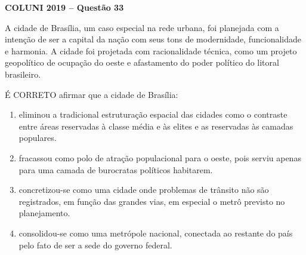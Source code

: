 \textbf{COLUNI 2019 -- Questão 33}\par\medskip A cidade de Brasília, um caso especial na rede urbana, foi planejada com a intenção de ser a capital da nação com seus tons de modernidade, funcionalidade e harmonia. A cidade foi projetada com racionalidade técnica, como um projeto geopolítico de ocupação do oeste e afastamento do poder político do litoral brasileiro.

\par

É CORRETO afirmar que a cidade de Brasília:\begin{enumerate}
\item eliminou a tradicional estruturação espacial das cidades como o contraste entre áreas reservadas à classe
      média e às elites e as reservadas às camadas populares.
\item fracassou como polo de atração populacional para o oeste, pois serviu apenas para uma camada de
      burocratas políticos habitarem.
\item concretizou-se como uma cidade onde problemas de trânsito não são registrados, em função das grandes
      vias, em especial o metrô previsto no planejamento.
\item consolidou-se como uma metrópole nacional, conectada ao restante do país pelo fato de ser a sede do
      governo federal.\end{enumerate}
